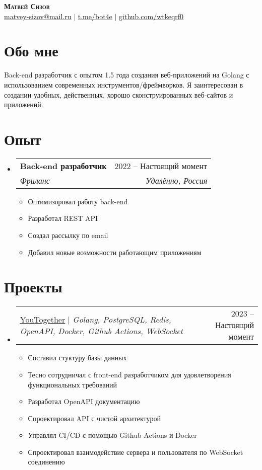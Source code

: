 \documentclass[letterpaper,11pt]{article}
\makeatletter
\newcommand{\resumeItem}[1]{
  \item\small{
    {#1 \vspace{-2pt}}
  }
}
\newcommand{\resumeSubheading}[4]{
  \vspace{-2pt}\item
    \begin{tabular*}{0.97\textwidth}[t]{l@{\extracolsep{\fill}}r}
      \textbf{#1} & #2 \\
      \textit{\small#3} & \textit{\small #4} \\
    \end{tabular*}\vspace{-7pt}
}
\newcommand{\resumeProjectHeading}[2]{
    \item
    \begin{tabular*}{0.97\textwidth}{l@{\extracolsep{\fill}}r}
      \small#1 & #2 \\
    \end{tabular*}\vspace{-7pt}
}
\newcommand{\resumeSubHeadingListStart}{\begin{itemize}[leftmargin=0.15in, label={}]}
\newcommand{\resumeSubHeadingListEnd}{\end{itemize}}
\newcommand{\resumeItemListStart}{\begin{itemize}}
\newcommand{\resumeItemListEnd}{\end{itemize}\vspace{-5pt}}
\makeatother
\begin{document}

\begin{center}
	\textbf{\Huge \scshape Матвей Сизов} \\ \vspace{1pt}
	\href{mailto:matvey-sizov@mail.ru}{\underline{matvey-sizov@mail.ru}} $|$ 
	\href{https://t.me/bot4e}{\underline{t.me/bot4e}} $|$
	\href{https://github.com/wtkeqrf0}{\underline{github.com/wtkeqrf0}}
\end{center}

\section{Обо мне}
\begin{itemize}[leftmargin=0.15in, label={}]
	\small{\item{Back-end разработчик с опытом 1.5 года создания веб-приложений на Golang с использованием современных инструментов/фреймворков. Я заинтересован в создании удобных, действенных, хорошо сконструированных веб-сайтов и приложений.} \
	}
\end{itemize}


\section{Опыт}
\resumeSubHeadingListStart

\resumeSubheading
{Back-end разработчик\emph{}}{2022 -- Настоящий момент}
{Фриланс}{Удалённо, Россия}
\resumeItemListStart
\resumeItem{Оптимизоровал работу back-end}
\resumeItem{Разработал REST API}
\resumeItem{Создал рассылку по email}
\resumeItem{Добавил новые возможности работающим приложениям}
\resumeItemListEnd

\resumeSubHeadingListEnd


\section{Проекты}
\resumeSubHeadingListStart
\resumeProjectHeading
{\href{https://github.com/youtogether-online}{\underline{YouTogether}} $|$ \emph{Golang, PostgreSQL, Redis, OpenAPI, Docker, Github Actions, WebSocket}}{2023 -- Настоящий момент}
\resumeItemListStart
\resumeItem{Составил стуктуру базы данных}
\resumeItem{Тесно сотрудничал с front-end разработчиком для удовлетворения функциональных требований}
\resumeItem{Разработал OpenAPI документацию}
\resumeItem{Спроектировал API с чистой архитектурой}
\resumeItem{Управлял CI/CD с помощью Github Actions и Docker}
\resumeItem{Спроектировал взаимодействие сервера и пользователя по WebSocket соединению}
\resumeItemListEnd
\resumeSubHeadingListEnd
\end{document}
